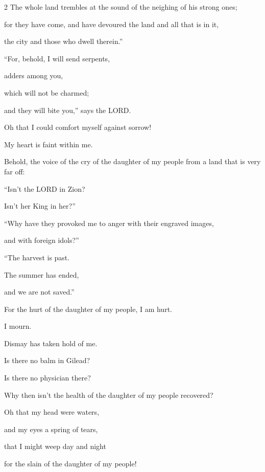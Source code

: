\begin{multicols}{2}
	The whole land trembles at the sound of the neighing of his strong ones;
	
	for they have come, and have devoured the land and all that is in it,
	
	the city and those who dwell therein.”
	
	
	\myverse{}“For, behold, I will send serpents,
	
	adders among you,
	
	which will not be charmed;
	
	and they will bite you,” says the LORD.
	
	
	\myverse{}Oh that I could comfort myself against sorrow!
	
	My heart is faint within me.
	
	
	\myverse{}Behold, the voice of the cry of the daughter of my people from
	a land that is very far off:
	
	“Isn’t the LORD in Zion?
	
	Isn’t her King in her?”
	
	\vspace{\baselineskip}
	
	“Why have they provoked me to anger with their engraved images,
	
	and with foreign idols?”
	
	\vspace{\baselineskip}
	
	\myverse{}“The harvest is past.
	
	The summer has ended,
	
	and we are not saved.”
	
	\vspace{\baselineskip}
	
	\myverse{}For the hurt of the daughter of my people, I am hurt.
	
	I mourn.
	
	Dismay has taken hold of me.
	
	
	\myverse{}Is there no balm in Gilead?
	
	Is there no physician there?
	
	Why then isn’t the health of the daughter of my people recovered?
	
	
	\mychapter{} \myverse*{}Oh that my head were waters,
	
	and my eyes a spring of tears,
	
	that I might weep day and night
	
	for the slain of the daughter of my people!
	

\end{multicols}

